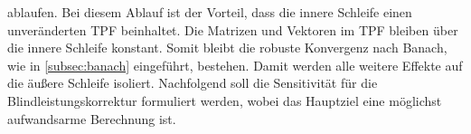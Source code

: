 ablaufen.
Bei diesem Ablauf ist der Vorteil, dass die innere Schleife einen unveränderten TPF beinhaltet. Die Matrizen und Vektoren im TPF bleiben über die innere Schleife konstant. Somit bleibt die robuste Konvergenz nach Banach, wie in \cref{subsec:banach} eingeführt, bestehen.
Damit werden alle weitere Effekte auf die äußere Schleife isoliert.
Nachfolgend soll die Sensitivität für die Blindleistungskorrektur formuliert werden, wobei das Hauptziel eine möglichst aufwandsarme Berechnung ist.






